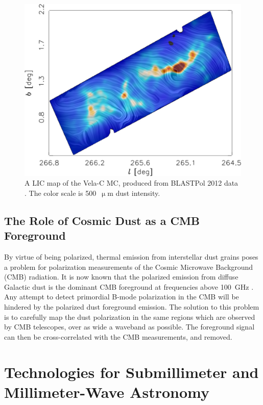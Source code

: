\begin{figure}[!htbp]
\centering
\includegraphics[width=\textwidth]{figures/intro/velac_lic}
\caption[A LIC map of Vela-C, from BLASTPol 2012 data.]{A LIC map of the Vela-C MC, produced from BLASTPol 2012 data \citep{fissel2016balloon}. The color scale is 500~$\upmu$m dust intensity.}
\label{fig:vela2012}
\end{figure}

\subsection{The Role of Cosmic Dust as a CMB Foreground}

By virtue of being polarized, thermal emission from interstellar dust grains poses a problem for polarization measurements of the Cosmic Microwave Background (CMB) radiation. It is now known that the polarized emission from diffuse Galactic dust is the dominant CMB foreground at frequencies above 100~GHz \citep{adam2016planck}. Any attempt to detect primordial B-mode polarization in the CMB will be hindered by the polarized dust foreground emission. The solution to this problem is to carefully map the dust polarization in the same regions which are observed by CMB telescopes, over as wide a waveband as possible. The foreground signal can then be cross-correlated with the CMB measurements, and removed.

\section{Technologies for Submillimeter and Millimeter-Wave Astronomy}

